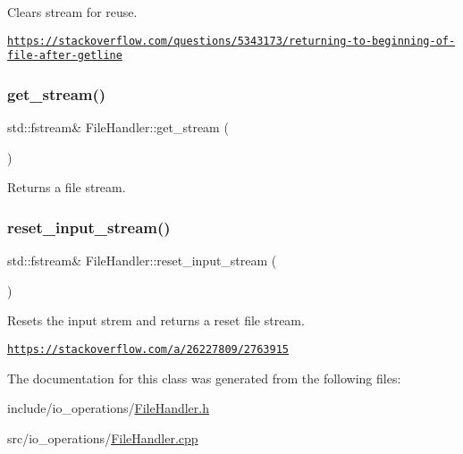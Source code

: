 Clears stream for reuse. 

\href{https://stackoverflow.com/questions/5343173/returning-to-beginning-of-file-after-getline}{\tt https\+://stackoverflow.\+com/questions/5343173/returning-\/to-\/beginning-\/of-\/file-\/after-\/getline} \mbox{\label{classFileHandler_a52ed391e1cbce69535fe5dd554f205f2}} 
\subsubsection{\texorpdfstring{get\+\_\+stream()}{get\_stream()}}
{\footnotesize\ttfamily std\+::fstream\& File\+Handler\+::get\+\_\+stream (\begin{DoxyParamCaption}{ }\end{DoxyParamCaption})\hspace{0.3cm}{\ttfamily [inline]}}



Returns a file stream. 

\mbox{\label{classFileHandler_a44807c8185a65201a5e183b634aacc6c}} 
\subsubsection{\texorpdfstring{reset\+\_\+input\+\_\+stream()}{reset\_input\_stream()}}
{\footnotesize\ttfamily std\+::fstream\& File\+Handler\+::reset\+\_\+input\+\_\+stream (\begin{DoxyParamCaption}{ }\end{DoxyParamCaption})\hspace{0.3cm}{\ttfamily [inline]}}



Resets the input strem and returns a reset file stream. 

\href{https://stackoverflow.com/a/26227809/2763915}{\tt https\+://stackoverflow.\+com/a/26227809/2763915} 

The documentation for this class was generated from the following files\+:\begin{DoxyCompactItemize}
\item 
include/io\+\_\+operations/\hyperlink{FileHandler_8h}{File\+Handler.\+h}\item 
src/io\+\_\+operations/\hyperlink{FileHandler_8cpp}{File\+Handler.\+cpp}\end{DoxyCompactItemize}

